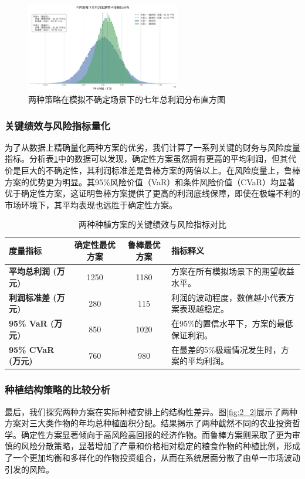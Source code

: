\begin{figure}[htbp]
	\centering
	\includegraphics[width=0.6\textwidth]{figures/2_1.png}
	\caption{两种策略在模拟不确定场景下的七年总利润分布直方图}
	\label{fig:2_1}
\end{figure}

\subsubsection{关键绩效与风险指标量化}

为了从数据上精确量化两种方案的优劣，我们计算了一系列关键的财务与风险度量指标。分析表\ref{tab:risk_metrics}中的数据可以发现，确定性方案虽然拥有更高的平均利润，但其代价是巨大的不确定性，其利润标准差是鲁棒方案的两倍以上。在风险度量上，鲁棒方案的优势更为明显。其95\%风险价值（VaR）和条件风险价值（CVaR）均显著优于确定性方案，这证明鲁棒方案提供了更高的利润底线保障，即使在极端不利的市场环境下，其平均表现也远胜于确定性方案。

\begin{table}[htbp]
	\centering
	\small
	\caption{两种种植方案的关键绩效与风险指标对比}
	\label{tab:risk_metrics}
	\begin{tabular}{lccp{7cm}}
		\toprule
		度量指标                    & 确定性最优方案 & 鲁棒最优方案 & 指标释义                    \\
		\midrule
		\textbf{平均总利润 (万元)}     & 1250    & 1180   & 方案在所有模拟场景下的期望收益水平。      \\
		\textbf{利润标准差 (万元)}     & 280     & 115    & 利润的波动程度，数值越小代表方案表现越稳定。  \\
		\textbf{95\% VaR (万元)}  & 850     & 1020   & 在95\%的置信水平下，方案的最低保证利润。  \\
		\textbf{95\% CVaR (万元)} & 760     & 980    & 在最差的5\%极端情况发生时，方案的平均利润。 \\
		\bottomrule
	\end{tabular}
\end{table}

\subsubsection{种植结构策略的比较分析}
最后，我们探究两种方案在实际种植安排上的结构性差异。图\ref{fig:2_2}展示了两种方案对三大类作物的年均总种植面积分配。结果揭示了两种截然不同的农业投资哲学。确定性方案显著倾向于高风险高回报的经济作物。而鲁棒方案则采取了更为审慎的风险分散策略，显著增加了产量和价格相对稳定的粮食作物的种植比例，形成了一个更加均衡和多样化的作物投资组合，从而在系统层面分散了由单一市场波动引发的风险。

